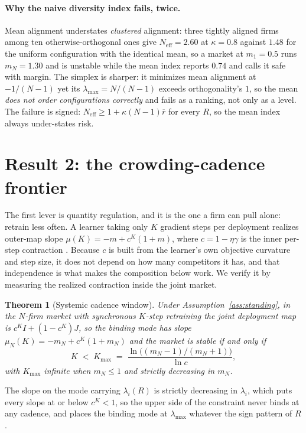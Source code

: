 \documentclass{article}
\theoremstyle{plain}
\newtheorem{theorem}{Theorem}
\theoremstyle{definition}
\newcommand{\Neff}{N_{\mathrm{eff}}}
\newcommand{\mN}{m_N}
\newcommand{\lmax}{\lambda_{\max}}
\begin{document}
\paragraph{Why the naive diversity index fails, twice.}
Mean alignment understates \emph{clustered} alignment: three tightly aligned firms among ten otherwise-orthogonal ones give $\Neff = 2.60$ at $\kappa=0.8$ against $1.48$ for the uniform configuration with the identical mean, so a market at $m_1 = 0.5$ runs $\mN = 1.30$ and is unstable while the mean index reports $0.74$ and calls it safe with margin. The simplex is sharper: it minimizes mean alignment at $-1/(N-1)$ yet its $\lmax = N/(N-1)$ exceeds orthogonality's $1$, so the mean \emph{does not order configurations correctly} and fails as a ranking, not only as a level. The failure is signed: $\Neff \geq 1 + \kappa(N-1)\overline{r}$ for every $R$, so the mean index always under-states risk.

\section{Result 2: the crowding-cadence frontier}
\label{sec:cadence}

The first lever is quantity regulation, and it is the one a firm can pull alone: retrain less often. A learner taking only $K$ gradient steps per deployment realizes outer-map slope $\mu(K) = -m + c^K(1+m)$, where $c = 1-\eta\gamma$ is the inner per-step contraction \citep{mendlerdunner2020}. Because $c$ is built from the learner's own objective curvature and step size, it does not depend on how many competitors it has, and that independence is what makes the composition below work. We verify it by measuring the realized contraction inside the joint market.

\begin{theorem}[Systemic cadence window]
\label{thm:cadence}
Under Assumption~\ref{ass:standing}, in the $N$-firm market with synchronous $K$-step retraining the joint deployment map is $c^K I + (1-c^K)J$, so the binding mode has slope $\mu_N(K) = -\mN + c^K(1+\mN)$ and the market is stable if and only if
\begin{equation}
K \;<\; K_{\max} \;=\; \frac{\ln\bigl((\mN-1)/(\mN+1)\bigr)}{\ln c},
\end{equation}
with $K_{\max}$ infinite when $\mN \le 1$ and strictly decreasing in $\mN$.
\end{theorem}

The slope on the mode carrying $\lambda_i(R)$ is strictly decreasing in $\lambda_i$, which puts every slope at or below $c^K<1$, so the upper side of the constraint never binds at any cadence, and places the binding mode at $\lmax$ whatever the sign pattern of $R$.
\end{document}
